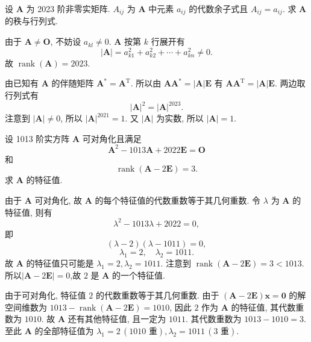 \documentclass[../../main.tex]{subfiles}%
\begin{document}
\begin{example}
设 \(\boldsymbol{A}\) 为 2023 阶非零实矩阵. \(A_{ij}\) 为 \(\boldsymbol{A}\) 中元素 \(a_{ij}\) 的代数余子式且 \(A_{ij} = a_{ij}\). 求 \(\boldsymbol{A}\) 的秩与行列式.
\end{example}
\begin{solution}

由于 \(\boldsymbol{A} \neq \boldsymbol{O}\), 不妨设 \(a_{kl} \neq 0\). \(\boldsymbol{A}\) 按第 \(k\) 行展开有
\[
|\boldsymbol{A}| = a_{k1}^2 + a_{k2}^2 + \cdots + a_{kn}^2 \neq 0.
\]
故 \(\operatorname{rank}(\boldsymbol{A}) = 2023\).

由已知有 \(\boldsymbol{A}\) 的伴随矩阵 \(\boldsymbol{A}^* = \boldsymbol{A}^\mathrm{T}\). 所以由 \(\boldsymbol{A}\boldsymbol{A}^* = |\boldsymbol{A}|\boldsymbol{E}\) 有 \(\boldsymbol{A}\boldsymbol{A}^\mathrm{T} = |\boldsymbol{A}|\boldsymbol{E}\). 两边取行列式有
\[
|\boldsymbol{A}|^2 = |\boldsymbol{A}|^{2023}.
\]
注意到 \(|\boldsymbol{A}| \neq 0\), 所以 \(|\boldsymbol{A}|^{2021} = 1\). 又 \(|\boldsymbol{A}|\) 为实数, 所以 \(|\boldsymbol{A}| = 1\).

\end{solution}

\begin{example}
设 1013 阶实方阵 \(\boldsymbol{A}\) 可对角化且满足
\[
\boldsymbol{A}^2 - 1013\boldsymbol{A} + 2022\boldsymbol{E} = \boldsymbol{O}
\]
和
\[
\operatorname{rank}(\boldsymbol{A} - 2\boldsymbol{E}) = 3.
\]
求 \(\boldsymbol{A}\) 的特征值.
\end{example}
\begin{solution}

由于 \(\boldsymbol{A}\) 可对角化, 故 \(\boldsymbol{A}\) 的每个特征值的代数重数等于其几何重数. 令 \(\lambda\) 为 \(\boldsymbol{A}\) 的特征值, 则有
\[
\lambda^2 - 1013\lambda + 2022 = 0,
\]
即
\[
(\lambda - 2)(\lambda - 1011) = 0,
\]
\[
\lambda_1 = 2, \quad \lambda_2 = 1011.
\]
故 \(\boldsymbol{A}\) 的特征值只可能是 \(\lambda_1 = 2, \lambda_2 = 1011\). 注意到 \(\operatorname{rank}(\boldsymbol{A} - 2\boldsymbol{E}) = 3 < 1013\). 所以$|\boldsymbol{A} - 2\boldsymbol{E}|=0$,故 \(2\) 是 \(\boldsymbol{A}\) 的一个特征值.

由于可对角化, 特征值 \(2\) 的代数重数等于其几何重数. 由于 \((\boldsymbol{A} - 2\boldsymbol{E})\boldsymbol{x} = \boldsymbol{0}\) 的解空间维数为 \(1013 - \operatorname{rank}(\boldsymbol{A} - 2\boldsymbol{E}) = 1010\), 因此 \(2\) 作为 \(\boldsymbol{A}\) 的特征值, 其代数重数为 \(1010\). 故 \(\boldsymbol{A}\) 还有其他特征值, 且一定为 \(1011\). 其代数重数为 \(1013 - 1010 = 3\). 至此 \(\boldsymbol{A}\) 的全部特征值为 \(\lambda_1 = 2 \, (1010 \text{ 重}), \lambda_2 = 1011 \, (3 \text{ 重})\).

\end{solution}
\end{document}
